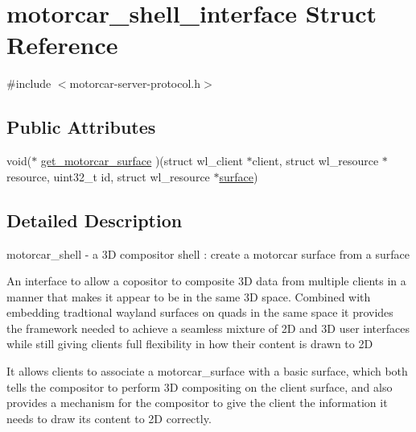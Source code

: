 \hypertarget{structmotorcar__shell__interface}{\section{motorcar\-\_\-shell\-\_\-interface Struct Reference}
\label{structmotorcar__shell__interface}
}


{\ttfamily \#include $<$motorcar-\/server-\/protocol.\-h$>$}

\subsection*{Public Attributes}
\begin{DoxyCompactItemize}
\item 
void($\ast$ \hyperlink{structmotorcar__shell__interface_a48c566c33704d3f369f3768bae578f19}{get\-\_\-motorcar\-\_\-surface} )(struct wl\-\_\-client $\ast$client, struct wl\-\_\-resource $\ast$resource, uint32\-\_\-t id, struct wl\-\_\-resource $\ast$\hyperlink{simple-egl_8c_a0720952aa1caded45b5bcdce589663a9}{surface})
\end{DoxyCompactItemize}


\subsection{Detailed Description}
motorcar\-\_\-shell -\/ a 3\-D compositor shell \-: create a motorcar surface from a surface

An interface to allow a copositor to composite 3\-D data from multiple clients in a manner that makes it appear to be in the same 3\-D space. Combined with embedding tradtional wayland surfaces on quads in the same space it provides the framework needed to achieve a seamless mixture of 2\-D and 3\-D user interfaces while still giving clients full flexibility in how their content is drawn to 2\-D

It allows clients to associate a motorcar\-\_\-surface with a basic surface, which both tells the compositor to perform 3\-D compositing on the client surface, and also provides a mechanism for the compositor to give the client the information it needs to draw its content to 2\-D correctly. 

